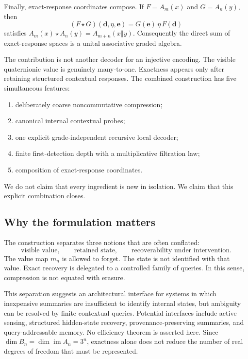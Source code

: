 \documentclass[11pt]{article}
\theoremstyle{definition}
\theoremstyle{remark}
\newcommand{\im}{\operatorname{im}}
\newcommand{\concat}{\mathbin{\Vert}}
\newcommand{\bridge}{\star}
\begin{document}
Finally, exact-response coordinates compose.  If $F=A_m(x)$ and $G=A_n(y)$, then
\begin{equation}\label{eq:bridge-intro}
  (F\bridge G)(\mathbf d,\eta,\mathbf e)
  =G(\mathbf e)\,\eta\,F(\mathbf d)
\end{equation}
satisfies $A_m(x)\bridge A_n(y)=A_{m+n}(x\concat y)$.  Consequently the direct sum of exact-response spaces is a unital associative graded algebra.

The contribution is not another decoder for an injective encoding.  The visible quaternionic value is genuinely many-to-one.  Exactness appears only after retaining structured contextual responses.  The combined construction has five simultaneous features:
\begin{enumerate}
  \item deliberately coarse noncommutative compression;
  \item canonical internal contextual probes;
  \item one explicit grade-independent recursive local decoder;
  \item finite first-detection depth with a multiplicative filtration law;
  \item composition of exact-response coordinates.
\end{enumerate}
We do not claim that every ingredient is new in isolation.  We claim that this explicit combination closes.

\subsection{Why the formulation matters}

The construction separates three notions that are often conflated:
\[
  \text{visible value},\qquad \text{retained state},\qquad
  \text{recoverability under intervention}.
\]
The value map $m_n$ is allowed to forget.  The state is not identified with that value.  Exact recovery is delegated to a controlled family of queries.  In this sense, compression is not equated with erasure.

This separation suggests an architectural interface for systems in which inexpensive summaries are insufficient to identify internal states, but ambiguity can be resolved by finite contextual queries.  Potential interfaces include active sensing, structured hidden-state recovery, provenance-preserving summaries, and query-addressable memory.  No efficiency theorem is asserted here.  Since $\dim B_n=\dim\im A_n=3^n$, exactness alone does not reduce the number of real degrees of freedom that must be represented.
\end{document}
